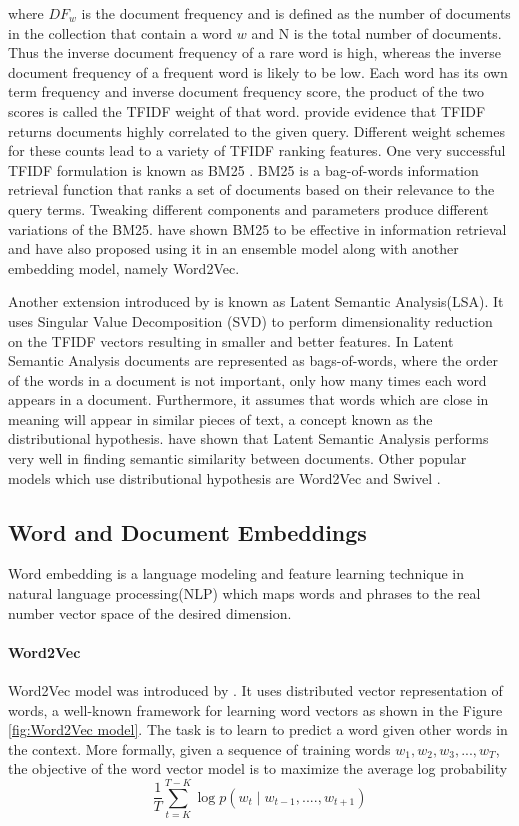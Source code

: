 where $DF_{w}$ is the document frequency and is defined as the number of documents in the collection that contain a word $w$ and N is the total number of documents. Thus the inverse document frequency of a rare word is high, whereas the inverse document frequency of a frequent word is likely to be low. Each word has its own term frequency and inverse document frequency score, the product of the two scores is called the TFIDF weight of that word. \citet{ramos2003using} provide evidence that TFIDF returns
documents highly correlated to the given query. Different weight schemes for these counts lead to a variety of TFIDF ranking features. One very successful TFIDF
formulation is known as BM25 \citep{robertson2009probabilistic}.
BM25  is a bag-of-words information retrieval function that ranks a set of documents based on their relevance to the query terms. Tweaking different components and parameters produce different variations of the BM25. \citet{mitra2016dual} have shown BM25 to be effective in information retrieval and have also proposed using it in an ensemble model along with another embedding model, namely Word2Vec. 


Another extension introduced by \citet{dumais2004latent} is known as Latent Semantic Analysis(LSA). It uses Singular Value Decomposition (SVD) to perform dimensionality reduction on the TFIDF vectors resulting in smaller and better features. In Latent Semantic Analysis documents are represented as bags-of-words, where the order of the words in a document is not important, only how many times each word appears in a document. Furthermore, it assumes that words which are close in meaning will appear in similar pieces of text, a concept known as the distributional hypothesis. \citet{boling2014semantic} have shown that Latent Semantic Analysis performs very well in finding semantic similarity between documents. Other popular models which use distributional hypothesis are Word2Vec \citep{mikolov2013efficient} and Swivel \citep{shazeer2016swivel}.
\subsection{Word and Document Embeddings} 
Word embedding is a language modeling and feature learning technique in natural language processing(NLP) which maps words and phrases to the real number vector space of the desired dimension. 

\paragraph{Word2Vec} Word2Vec model was  introduced by \citet{mikolov2013efficient}. It uses distributed vector representation of words, a well-known framework for learning word vectors as shown in the Figure \ref{fig:Word2Vec model}. The task is to learn to predict a word given other words in the context.
More formally, given a sequence of training words
$w_{1}, w_{2}, w_{3}, ..., w_{T} $, the objective of the word vector model is to maximize the average log probability
\\
\begin{equation}
\frac{1}{T} \sum_{t=K}^{T-K} \log p(w_{t} \mid w_{t-1},....,w_{t+1}) 
\end{equation}

